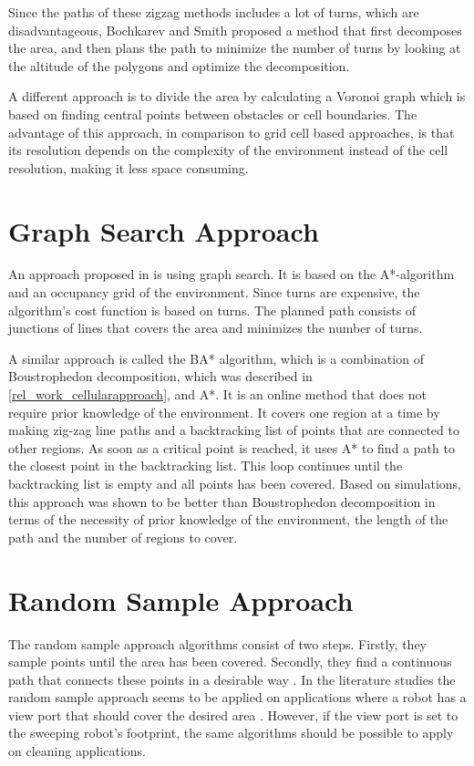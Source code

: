 Since the paths of these zigzag methods includes a lot of turns, which are disadvantageous, Bochkarev and Smith \cite{7743548} proposed a method that first decomposes the area, and then plans the path to minimize the number of turns by looking at the altitude of the polygons and optimize the decomposition.

A different approach is to divide the area by calculating a Voronoi graph which is based on finding central points between obstacles or cell boundaries. The advantage of this approach, in comparison to grid cell based approaches, is that its resolution depends on the complexity of the environment instead of the cell resolution, making it less space consuming. \cite{THRUN199821} 

\section{Graph Search Approach}
\label{rel_work_graph_search}
An approach proposed in \cite{astarapproach} is using graph search. It is based on the A*-algorithm and an occupancy grid of the environment. Since turns are expensive, the algorithm's cost function is based on turns. The planned path consists of junctions of lines that covers the area and minimizes the number of turns.

A similar approach is called the BA* algorithm, which is a combination of Boustrophedon decomposition, which was described in \ref{rel_work_cellularapproach}, and A*. It is an online method that does not require prior knowledge of the environment. It covers one region at a time by making zig-zag line paths and a backtracking list of points that are connected to other regions. As soon as a critical point is reached, it uses A* to find a path to the closest point in the backtracking list. This loop continues until the backtracking list is empty and all points has been covered. Based on simulations, this approach was shown to be better than Boustrophedon decomposition in terms of the necessity of prior knowledge of the environment, the length of the path and the number of regions to cover. \cite{bastar}

\section{Random Sample Approach}
\label{rel_work_randomsampleapproach}
The random sample approach algorithms consist of two steps. Firstly, they sample points until the area has been covered. Secondly, they find a continuous path that connects these points in a desirable way \cite{mattiassurvey}. In the literature studies the random sample approach seems to be applied on applications where a robot has a view port that should cover the desired area \cite{844726} \cite{Gonzalez} \cite{6386126} \cite{3drandomsample}. However, if the view port is set to the sweeping robot's footprint, the same algorithms should be possible to apply on cleaning applications.

